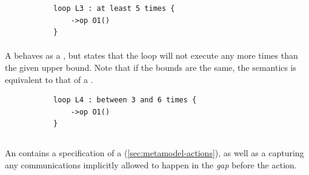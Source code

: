 \begin{figure}[h!]
\begin{subfigure}[t]{\egtextwidth}
\begin{lstlisting}[style=Example]
loop L3 : at least 5 times {
    ->op O1()
}
\end{lstlisting}
\end{subfigure}
\hfill
\begin{subfigure}[t]{\eggraphicalwidth}
  \gsecaption
  \centering
\end{subfigure}
\end{figure}

\paragraph{\mrangeloopbound}
A \mrangeloopbound{} behaves as a \mlowerloopbound, but states that
the loop will not execute any more times than the given upper bound.
Note that if the bounds are the same, the semantics is equivalent
to that of a \mdefiniteloopbound{}.

\begin{figure}[H]
\begin{subfigure}[t]{\egtextwidth}
\begin{lstlisting}[style=Example]
loop L4 : between 3 and 6 times {
    ->op O1()
}
\end{lstlisting}
\end{subfigure}
\hfill
\begin{subfigure}[t]{\eggraphicalwidth}
  \gsecaption
  \centering
\end{subfigure}
\end{figure}

\subsection{\mactionstep}\label{ssec:metamodel-steps-actions}

An \mactionstep{} contains a specification of a
\msequenceaction{} (\cref{sec:metamodel-actions}), as well as
a \mmessageset{}
capturing any communications implicitly allowed to happen
in the \emph{gap} before the action.

